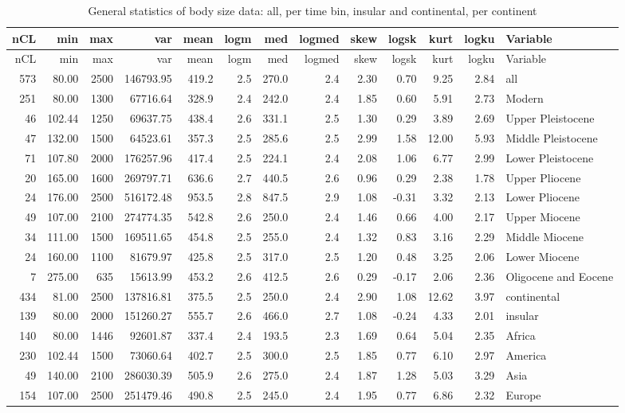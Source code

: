 \documentclass[]{article}
\begin{document}
\begin{longtable}[]{@{}rrrrrrrrrrrrl@{}}
\caption{General statistics of body size data: all, per time bin,
insular and continental, per continent}\tabularnewline
\toprule
nCL & min & max & var & mean & logm & med & logmed & skew & logsk & kurt
& logku & Variable\tabularnewline
\midrule
\endfirsthead
\toprule
nCL & min & max & var & mean & logm & med & logmed & skew & logsk & kurt
& logku & Variable\tabularnewline
\midrule
\endhead
573 & 80.00 & 2500 & 146793.95 & 419.2 & 2.5 & 270.0 & 2.4 & 2.30 & 0.70
& 9.25 & 2.84 & all\tabularnewline
251 & 80.00 & 1300 & 67716.64 & 328.9 & 2.4 & 242.0 & 2.4 & 1.85 & 0.60
& 5.91 & 2.73 & Modern\tabularnewline
46 & 102.44 & 1250 & 69637.75 & 438.4 & 2.6 & 331.1 & 2.5 & 1.30 & 0.29
& 3.89 & 2.69 & Upper Pleistocene\tabularnewline
47 & 132.00 & 1500 & 64523.61 & 357.3 & 2.5 & 285.6 & 2.5 & 2.99 & 1.58
& 12.00 & 5.93 & Middle Pleistocene\tabularnewline
71 & 107.80 & 2000 & 176257.96 & 417.4 & 2.5 & 224.1 & 2.4 & 2.08 & 1.06
& 6.77 & 2.99 & Lower Pleistocene\tabularnewline
20 & 165.00 & 1600 & 269797.71 & 636.6 & 2.7 & 440.5 & 2.6 & 0.96 & 0.29
& 2.38 & 1.78 & Upper Pliocene\tabularnewline
24 & 176.00 & 2500 & 516172.48 & 953.5 & 2.8 & 847.5 & 2.9 & 1.08 &
-0.31 & 3.32 & 2.13 & Lower Pliocene\tabularnewline
49 & 107.00 & 2100 & 274774.35 & 542.8 & 2.6 & 250.0 & 2.4 & 1.46 & 0.66
& 4.00 & 2.17 & Upper Miocene\tabularnewline
34 & 111.00 & 1500 & 169511.65 & 454.8 & 2.5 & 255.0 & 2.4 & 1.32 & 0.83
& 3.16 & 2.29 & Middle Miocene\tabularnewline
24 & 160.00 & 1100 & 81679.97 & 425.8 & 2.5 & 317.0 & 2.5 & 1.20 & 0.48
& 3.25 & 2.06 & Lower Miocene\tabularnewline
7 & 275.00 & 635 & 15613.99 & 453.2 & 2.6 & 412.5 & 2.6 & 0.29 & -0.17 &
2.06 & 2.36 & Oligocene and Eocene\tabularnewline
434 & 81.00 & 2500 & 137816.81 & 375.5 & 2.5 & 250.0 & 2.4 & 2.90 & 1.08
& 12.62 & 3.97 & continental\tabularnewline
139 & 80.00 & 2000 & 151260.27 & 555.7 & 2.6 & 466.0 & 2.7 & 1.08 &
-0.24 & 4.33 & 2.01 & insular\tabularnewline
140 & 80.00 & 1446 & 92601.87 & 337.4 & 2.4 & 193.5 & 2.3 & 1.69 & 0.64
& 5.04 & 2.35 & Africa\tabularnewline
230 & 102.44 & 1500 & 73060.64 & 402.7 & 2.5 & 300.0 & 2.5 & 1.85 & 0.77
& 6.10 & 2.97 & America\tabularnewline
49 & 140.00 & 2100 & 286030.39 & 505.9 & 2.6 & 275.0 & 2.4 & 1.87 & 1.28
& 5.03 & 3.29 & Asia\tabularnewline
154 & 107.00 & 2500 & 251479.46 & 490.8 & 2.5 & 245.0 & 2.4 & 1.95 &
0.77 & 6.86 & 2.32 & Europe\tabularnewline
\bottomrule
\end{longtable}

\newpage
\end{document}

